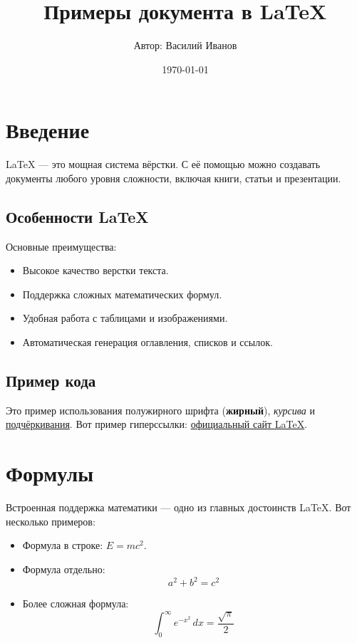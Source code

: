 \documentclass[a4paper,12pt]{article} %
\title{Примеры документа в LaTeX}
\author{Автор: Василий Иванов}
\date{\today}
\begin{document}
\maketitle %
\tableofcontents %
\newpage

\section{Введение}

LaTeX — это мощная система вёрстки. С её помощью можно создавать документы любого уровня сложности, включая книги, статьи и презентации.

\subsection{Особенности LaTeX}

Основные преимущества:
\begin{itemize}
    \item Высокое качество верстки текста.
    \item Поддержка сложных математических формул.
    \item Удобная работа с таблицами и изображениями.
    \item Автоматическая генерация оглавления, списков и ссылок.
\end{itemize}

\subsection{Пример кода}

Это пример использования полужирного шрифта (\textbf{жирный}), \textit{курсива} и \underline{подчёркивания}. Вот пример гиперссылки: \href{https://www.latex-project.org}{официальный сайт LaTeX}.

\section{Формулы}

Встроенная поддержка математики — одно из главных достоинств LaTeX. Вот несколько примеров:
\begin{itemize}
    \item Формула в строке: \(E = mc^2\).
    \item Формула отдельно:
    \[
    a^2 + b^2 = c^2
    \]
    \item Более сложная формула:
    \[
    \int_{0}^{\infty} e^{-x^2} \, dx = \frac{\sqrt{\pi}}{2}
    \]
\end{itemize}
\end{document}
